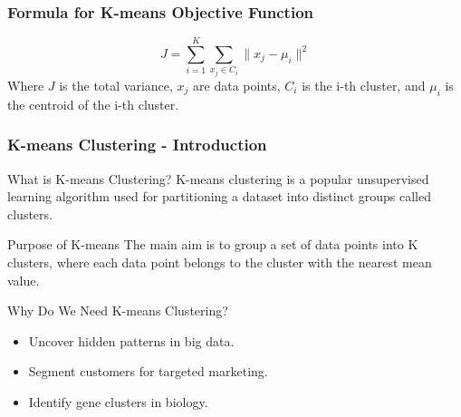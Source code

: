 \documentclass[aspectratio=169]{beamer}
\begin{document}
\begin{frame}[fragile]
    \frametitle{Formula for K-means Objective Function}
    \begin{equation}
        J = \sum_{i=1}^K \sum_{x_j \in C_i} \lVert x_j - \mu_i \rVert^2
    \end{equation}
    Where $J$ is the total variance, $x_j$ are data points, $C_i$ is the i-th cluster, and $\mu_i$ is the centroid of the i-th cluster.
\end{frame}

\begin{frame}[fragile]
    \frametitle{K-means Clustering - Introduction}
    \begin{block}{What is K-means Clustering?}
        K-means clustering is a popular unsupervised learning algorithm used for partitioning a dataset into distinct groups called clusters.
    \end{block}
    
    \begin{block}{Purpose of K-means}
        The main aim is to group a set of data points into K clusters, where each data point belongs to the cluster with the nearest mean value.
    \end{block}
    
    \begin{block}{Why Do We Need K-means Clustering?}
        \begin{itemize}
            \item Uncover hidden patterns in big data.
            \item Segment customers for targeted marketing.
            \item Identify gene clusters in biology.
        \end{itemize}
    \end{block}
\end{frame}
\end{document}
